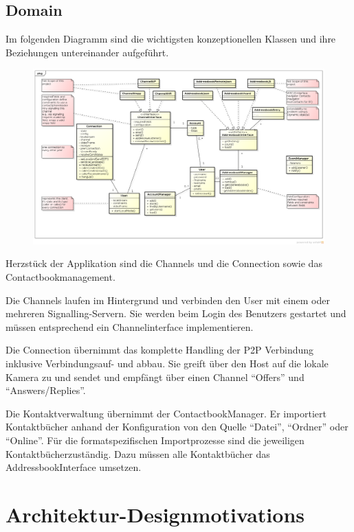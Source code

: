 \begin{landscape}
\section{Domain}
	Im folgenden Diagramm sind die wichtigsten konzeptionellen Klassen und ihre Beziehungen untereinander aufgeführt.
	\begin{figure}[H]
		\centering
		\includegraphics[width=1.2\textwidth]{../architekturanalayse/img/domain.png}
	\end{figure}
	Herzstück der Applikation sind die Channels und die Connection sowie das Contactbookmanagement.
	
	Die Channels laufen im Hintergrund und verbinden den User mit einem oder mehreren Signalling-Servern. Sie werden beim Login des Benutzers gestartet und müssen entsprechend ein Channelinterface implementieren.
	
	Die Connection übernimmt das komplette Handling der P2P Verbindung inklusive Verbindungsauf- und abbau. Sie greift über den Host auf die lokale Kamera zu und sendet und empfängt über einen Channel ``Offers'' und ``Answers/Replies''.
	
	Die Kontaktverwaltung übernimmt der ContactbookManager. Er importiert Kontaktbücher anhand der Konfiguration von den Quelle ``Datei'', ``Ordner'' oder ``Online''. Für die formatspezifischen Importprozesse sind die jeweiligen Kontaktbücherzuständig. Dazu müssen alle Kontaktbücher das AddressbookInterface umsetzen.
\end{landscape}
\clearpage

\section{Architektur-Designmotivations}
